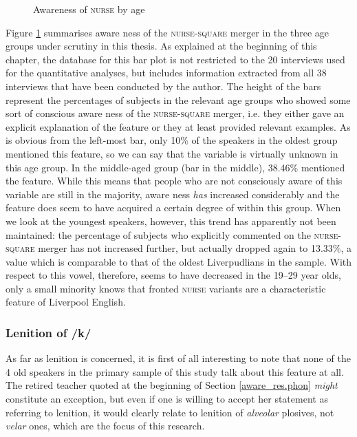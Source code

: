 \begin{figure}[h]
	\centering
		\resizebox{.49\linewidth}{!}{} 
	\caption{Awareness of \textsc{nurse} by age}
	\label{fig.aware.nurse}
\end{figure}

Figure \ref{fig.aware.nurse} summarises aware ness of the \textsc{nurse}-\textsc{square} merger in the three age groups under scrutiny in this thesis.
As explained at the beginning of this chapter, the database for this bar plot is not restricted to the 20 interviews used for the quantitative analyses, but includes information extracted from all 38 interviews that have been conducted by the author.
The height of the bars represent the percentages of subjects in the relevant age groups who showed some sort of conscious aware ness of the \textsc{nurse}-\textsc{square} merger, i.e. they either gave an explicit explanation of the feature or they at least provided relevant examples.
As is obvious from the left-most bar, only 10\% of the speakers in the oldest group mentioned this feature, so we can say that the variable is virtually unknown in this age group.
In the middle-aged group (bar in the middle), 38.46\% mentioned the feature.
While this means that people who are not consciously aware  of this variable are still in the majority, aware ness \emph{has} increased considerably and the feature does seem to have acquired a certain degree of  within this group.
When we look at the youngest speakers, however, this trend has apparently not been maintained: the percentage of subjects who explicitly commented on the \textsc{nurse}-\textsc{square} merger has not increased further, but actually dropped again to 13.33\%, a value which is comparable to that of the oldest Liverpudlians in the sample.
With respect to this vowel, therefore,  seems to have decreased in the 19--29 year olds, only a small minority knows that fronted \textsc{nurse} variants are a characteristic feature of Liverpool English.

\subsubsection{Lenition of /k/}
\label{aware_res.phon.k}

As far as lenition is concerned, it is first of all interesting to note that none of the 4 old speakers in the primary sample of this study talk about this feature at all.
The retired teacher quoted at the beginning of Section \ref{aware_res.phon} \emph{might} constitute an exception, but even if one is willing to accept her statement as referring to lenition, it would clearly relate to lenition of \emph{alveolar} plosives, not \emph{velar} ones, which are the focus of this research.

